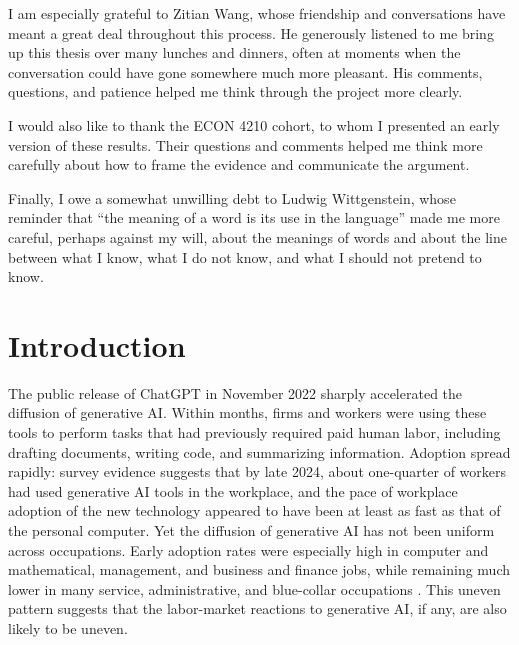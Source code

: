 \documentclass[11pt]{article}
\theoremstyle{plain}
\theoremstyle{remark}
\begin{document}
I am especially grateful to Zitian Wang, whose friendship and conversations have meant a great deal throughout this process. He generously listened to me bring up this thesis over many lunches and dinners, often at moments when the conversation could have gone somewhere much more pleasant. His comments, questions, and patience helped me think through the project more clearly.

I would also like to thank the ECON 4210 cohort, to whom I presented an early version of these results. Their questions and comments helped me think more carefully about how to frame the evidence and communicate the argument.

Finally, I owe a somewhat unwilling debt to Ludwig Wittgenstein, whose reminder that ``the meaning of a word is its use in the language'' made me more careful, perhaps against my will, about the meanings of words and about the line between what I know, what I do not know, and what I should not pretend to know.

\clearpage
\doublespacing


\begin{singlespace}
\tableofcontents
\end{singlespace}
\clearpage


\section{Introduction}
\label{sec:intro}

The public release of ChatGPT in November 2022 sharply accelerated the diffusion of generative AI.  Within months, firms and workers were using these tools to perform tasks that had previously required paid human labor, including drafting documents, writing code, and summarizing information.  Adoption spread rapidly: survey evidence suggests that by late 2024, about one-quarter of workers had used generative AI tools in the workplace, and the pace of workplace adoption of the new technology appeared to have been at least as fast as that of the personal computer.  Yet the diffusion of generative AI has not been uniform across occupations.  Early adoption rates were especially high in computer and mathematical, management, and business and finance jobs, while remaining much lower in many service, administrative, and blue-collar occupations \parencite{bick2024rapid}.  This uneven pattern suggests that the labor-market reactions to generative AI, if any, are also likely to be uneven.
\end{document}
